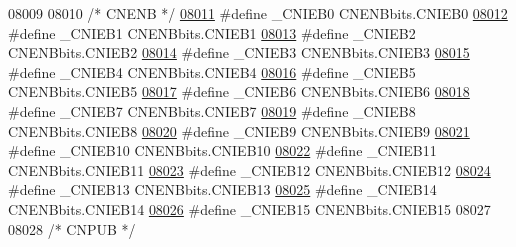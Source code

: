 \begin{DoxyCode}
08009 
08010 \textcolor{comment}{/* CNENB */}
\hypertarget{a00009_source_l08011}{}\hyperlink{a00009_a64b062bf600bd96f16cf1708ac540e03}{08011} \textcolor{preprocessor}{#define \_CNIEB0 CNENBbits.CNIEB0}
\hypertarget{a00009_source_l08012}{}\hyperlink{a00009_a824653e72db22bdd658f44daaf34c587}{08012} \textcolor{preprocessor}{#define \_CNIEB1 CNENBbits.CNIEB1}
\hypertarget{a00009_source_l08013}{}\hyperlink{a00009_ac4a79a9ad014bebd7b1a77416b104085}{08013} \textcolor{preprocessor}{#define \_CNIEB2 CNENBbits.CNIEB2}
\hypertarget{a00009_source_l08014}{}\hyperlink{a00009_ab2a9550cbb5ee4fed0cebb3700bf1519}{08014} \textcolor{preprocessor}{#define \_CNIEB3 CNENBbits.CNIEB3}
\hypertarget{a00009_source_l08015}{}\hyperlink{a00009_ad28a8026c6014a54e421474fbecda145}{08015} \textcolor{preprocessor}{#define \_CNIEB4 CNENBbits.CNIEB4}
\hypertarget{a00009_source_l08016}{}\hyperlink{a00009_af1609dec4312e7ef987b963643f3fca2}{08016} \textcolor{preprocessor}{#define \_CNIEB5 CNENBbits.CNIEB5}
\hypertarget{a00009_source_l08017}{}\hyperlink{a00009_a79a43b4a19cbbccfc2146ccb1b02f4ec}{08017} \textcolor{preprocessor}{#define \_CNIEB6 CNENBbits.CNIEB6}
\hypertarget{a00009_source_l08018}{}\hyperlink{a00009_a2aae9c5a213fd9a35a440906a7d824c8}{08018} \textcolor{preprocessor}{#define \_CNIEB7 CNENBbits.CNIEB7}
\hypertarget{a00009_source_l08019}{}\hyperlink{a00009_a6fb5baec53bd683ad14917373f26404d}{08019} \textcolor{preprocessor}{#define \_CNIEB8 CNENBbits.CNIEB8}
\hypertarget{a00009_source_l08020}{}\hyperlink{a00009_a3e261f16da5f96912ee02fe35b5d6b28}{08020} \textcolor{preprocessor}{#define \_CNIEB9 CNENBbits.CNIEB9}
\hypertarget{a00009_source_l08021}{}\hyperlink{a00009_a7145d5104763093c1865ed3fe62a50d4}{08021} \textcolor{preprocessor}{#define \_CNIEB10 CNENBbits.CNIEB10}
\hypertarget{a00009_source_l08022}{}\hyperlink{a00009_ac13a423b158dcc59bae61d33fdd5344a}{08022} \textcolor{preprocessor}{#define \_CNIEB11 CNENBbits.CNIEB11}
\hypertarget{a00009_source_l08023}{}\hyperlink{a00009_a660ac02e2265bbc309c1e65606c232d4}{08023} \textcolor{preprocessor}{#define \_CNIEB12 CNENBbits.CNIEB12}
\hypertarget{a00009_source_l08024}{}\hyperlink{a00009_abfab18d208f717b85be4471bf84a40d4}{08024} \textcolor{preprocessor}{#define \_CNIEB13 CNENBbits.CNIEB13}
\hypertarget{a00009_source_l08025}{}\hyperlink{a00009_ab7beb22cb1be703a06f6465400bed643}{08025} \textcolor{preprocessor}{#define \_CNIEB14 CNENBbits.CNIEB14}
\hypertarget{a00009_source_l08026}{}\hyperlink{a00009_ab9a8320a41c53b87737d342631c38044}{08026} \textcolor{preprocessor}{#define \_CNIEB15 CNENBbits.CNIEB15}
08027 
08028 \textcolor{comment}{/* CNPUB */}

\end{DoxyCode}
